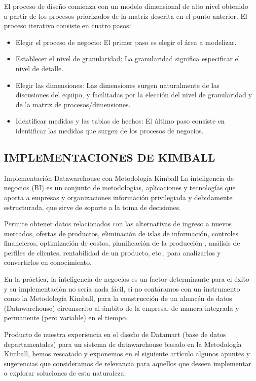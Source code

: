 \documentclass[%
 reprint,
 amsmath,amssymb,
 aps,
]{revtex4-1}
\begin{document}
El proceso de diseño comienza con un modelo dimensional de alto nivel obtenido a partir de los procesos priorizados de la matriz descrita en el punto anterior.
El proceso iterativo consiste en cuatro pasos:

\begin{itemize}
	\item Elegir el proceso de negocio: El primer paso es elegir el área a modelizar. 
    \item Establecer el nivel de granularidad: La granularidad significa especificar el nivel de detalle.
    \item Elegir las dimensiones: Las dimensiones surgen naturalmente de las discusiones del equipo, y facilitadas por la elección del nivel de granularidad y de la matriz de procesos/dimensiones. 
    \item Identificar medidas y las tablas de hechos: El último paso consiste en identificar las medidas que surgen de los procesos de negocios.
\end{itemize}

\subsection{IMPLEMENTACIONES DE KIMBALL}

Implementación Datawarehouse con Metodología Kimball
La inteligencia de negocios (BI) es un conjunto de metodologías, aplicaciones y tecnologías que aporta a empresas y organizaciones información privilegiada y debidamente estructurada, que sirve de soporte a la toma de decisiones.

Permite obtener datos relacionados con las alternativas de ingreso a nuevos mercados, ofertas de productos, eliminación de islas de información, controles financieros, optimización de costos, planificación de la producción , análisis de perfiles de clientes, rentabilidad de un producto, etc., para analizarlos y convertirlos en conocimiento.

En la práctica, la inteligencia de negocios es un factor determinante para el éxito y su implementación  no sería nada fácil, si no contáramos con un instrumento como la Metodología Kimball, para la construcción de un almacén de datos (Datawarehouse)  circunscrito al ámbito de la empresa, de manera integrada y permanente (pero variable) en el tiempo.

Producto de nuestra experiencia en el diseño de Datamart (base de datos departamentales) para un sistema de datawarehouse basado en la Metodología Kimball, hemos rescatado y exponemos en el  siguiente artículo algunos apuntes y sugerencias que consideramos de relevancia para aquellos que deseen implementar o explorar soluciones de esta naturaleza:
\end{document}
